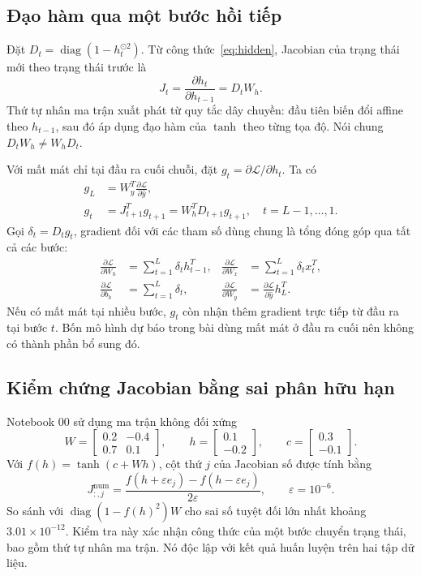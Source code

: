 \documentclass[12pt,a4paper]{report}
\begin{document}
\subsection{Đạo hàm qua một bước hồi tiếp}
Đặt $D_t=\operatorname{diag}(1-h_t^{\odot2})$. Từ công thức~\eqref{eq:hidden}, Jacobian của trạng thái mới theo trạng thái trước là
\begin{equation}
J_t=\frac{\partial h_t}{\partial h_{t-1}}=D_tW_h.
\label{eq:jacobian}
\end{equation}
Thứ tự nhân ma trận xuất phát từ quy tắc dây chuyền: đầu tiên biến đổi affine theo $h_{t-1}$, sau đó áp dụng đạo hàm của $\tanh$ theo từng tọa độ. Nói chung $D_tW_h\ne W_hD_t$.

Với mất mát chỉ tại đầu ra cuối chuỗi, đặt $g_t=\partial\mathcal{L}/\partial h_t$. Ta có
\begin{align}
g_L&=W_y^T\frac{\partial\mathcal{L}}{\partial\widehat y},\\
g_t&=J_{t+1}^Tg_{t+1}
     =W_h^TD_{t+1}g_{t+1},\quad t=L-1,\ldots,1.
\end{align}
Gọi $\delta_t=D_tg_t$, gradient đối với các tham số dùng chung là tổng đóng góp qua tất cả các bước:
\begin{align}
\frac{\partial\mathcal{L}}{\partial W_h}&=\sum_{t=1}^{L}\delta_th_{t-1}^T,&
\frac{\partial\mathcal{L}}{\partial W_x}&=\sum_{t=1}^{L}\delta_tx_t^T,\\
\frac{\partial\mathcal{L}}{\partial b_h}&=\sum_{t=1}^{L}\delta_t,&
\frac{\partial\mathcal{L}}{\partial W_y}&=\frac{\partial\mathcal{L}}{\partial\widehat y}h_L^T.
\end{align}
Nếu có mất mát tại nhiều bước, $g_t$ còn nhận thêm gradient trực tiếp từ đầu ra tại bước $t$. Bốn mô hình dự báo trong bài dùng mất mát ở đầu ra cuối nên không có thành phần bổ sung đó.

\subsection{Kiểm chứng Jacobian bằng sai phân hữu hạn}
Notebook 00 sử dụng ma trận không đối xứng
\[
W=\begin{bmatrix}0.2&-0.4\\0.7&0.1\end{bmatrix},\qquad
h=\begin{bmatrix}0.1\\-0.2\end{bmatrix},\qquad
c=\begin{bmatrix}0.3\\-0.1\end{bmatrix}.
\]
Với $f(h)=\tanh(c+Wh)$, cột thứ $j$ của Jacobian số được tính bằng
\begin{equation}
J_{:,j}^{\mathrm{num}}=\frac{f(h+\varepsilon e_j)-f(h-\varepsilon e_j)}{2\varepsilon},\qquad \varepsilon=10^{-6}.
\end{equation}
So sánh với $\operatorname{diag}(1-f(h)^2)W$ cho sai số tuyệt đối lớn nhất khoảng $3.01\times10^{-12}$. Kiểm tra này xác nhận công thức của một bước chuyển trạng thái, bao gồm thứ tự nhân ma trận. Nó độc lập với kết quả huấn luyện trên hai tập dữ liệu.
\end{document}
